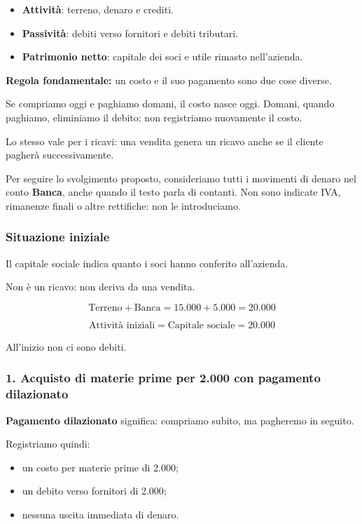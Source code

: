\begin{itemize}
    \item \textbf{Attività}: terreno, denaro e crediti.
    \item \textbf{Passività}: debiti verso fornitori
    e debiti tributari.
    \item \textbf{Patrimonio netto}: capitale dei soci
    e utile rimasto nell'azienda.
\end{itemize}

\medskip

\noindent \textbf{Regola fondamentale:}
un costo e il suo pagamento sono due cose diverse.

\noindent Se compriamo oggi e paghiamo domani,
il costo nasce oggi. Domani, quando paghiamo,
eliminiamo il debito: non registriamo nuovamente il costo.

\noindent Lo stesso vale per i ricavi:
una vendita genera un ricavo anche se il cliente
pagherà successivamente.

\medskip

\noindent Per seguire lo svolgimento proposto,
consideriamo tutti i movimenti di denaro nel conto
\textbf{Banca}, anche quando il testo parla di contanti.
Non sono indicate IVA, rimanenze finali o altre
rettifiche: non le introduciamo.

\subsubsection*{Situazione iniziale}

\noindent Il capitale sociale indica quanto
i soci hanno conferito all'azienda.

\noindent Non è un ricavo: non deriva da una vendita.

\[
\text{Terreno}+\text{Banca}
=
15.000+5.000=20.000
\]

\[
\boxed{
\text{Attività iniziali}
=
\text{Capitale sociale}
=
20.000
}
\]

\noindent All'inizio non ci sono debiti.

\subsubsection*{1. Acquisto di materie prime per 2.000
con pagamento dilazionato}

\noindent \textbf{Pagamento dilazionato} significa:
compriamo subito, ma pagheremo in seguito.

\noindent Registriamo quindi:

\begin{itemize}
    \item un costo per materie prime di 2.000;
    \item un debito verso fornitori di 2.000;
    \item nessuna uscita immediata di denaro.
\end{itemize}


